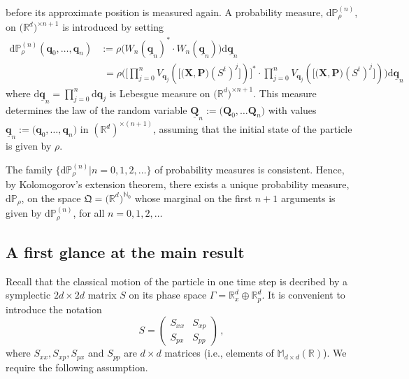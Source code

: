 \documentclass[11pt]{article}
\renewcommand{\d}{{\mathrm d}}
\begin{document}
before its approximate position is measured again.
A probability measure, $\d\mathbb{P}_{\rho}^{(n)}$, on $\big(\mathbb{R}^{d}\big)^{\times{n+1}}$ is introduced by setting
\begin{align}\label{prob}
\d \mathbb{P}^{(n)}_{\rho}(\mathbf{q}_0,\dots, \mathbf{q}_n)&:= \rho\big( W_{n}(\underline{\mathbf{q}}_n)^{*}\cdot 
W_{n}(\underline{\mathbf{q}}_n)\big) \d\underline{\mathbf{q}}_{n}\nonumber\\
&\,\,= \rho\Big(\big[ \prod_{j=0}^{n} V_{\mathbf{q}_j}(\big[\big(\mathbf{X}, \mathbf{P}\big) (S^{t})^{j} \big])\big]^{*}\cdot  \prod_{j=0}^{n} V_{\mathbf{q}_j}(\big[\big(\mathbf{X}, \mathbf{P}\big) (S^{t})^{j} \big])  \Big)\d\underline{\mathbf{q}}_n
\end{align}
where $\d\underline{\mathbf{q}}_{n} =\prod_{j=0}^{n} \d\mathbf{q}_{j}$ is Lebesgue measure on $\big(\mathbb{R}^{d}\big)^{\times{n+1}}$.
This measure determines the law of the random variable $\underline{\mathbf{Q}}_{n}:=\big(\mathbf{Q}_0,\dots \mathbf{Q}_{n}\big)$ with values $\underline{\mathbf{q}}_{n}:= \big(\mathbf{q}_0, \dots, \mathbf{q}_n\big)$ in 
$(\mathbb{R}^{d})^{\times (n+1)}$, assuming that the initial state of the particle is given by $\rho$.

The family  $\big\{\d\mathbb{P}_{\rho}^{(n)}\vert n=0,1,2,\dots\big\}$ of probability measures is consistent. Hence, by Kolomogorov's extension theorem,  there exists a unique probability measure, $\d\mathbb{P}_{\rho}$, on the space $\mathfrak{Q}=\big(\mathbb{R}^{d}\big)^{\mathbb{N}_0}$ whose marginal on the first $n+1$ arguments is given by $\d\mathbb{P}_{\rho}^{(n)}$, for all $n=0,1,2,\dots$

\subsection{A first glance at the main result}\label{main-result}
Recall that the classical motion of the particle in one time step is decribed by a symplectic $2d\times 2d$ matrix $S$ on its phase space $\Gamma= \mathbb{R}^{d}_{x}\oplus \mathbb{R}^{d}_{p}$. It is convenient to introduce the notation 
\begin{equation}\label{ABCD}
S= \begin{pmatrix} S_{xx} & S_{xp}\\
                              S_{px} & S_{pp} \end{pmatrix}\,,
\end{equation}                              
where $S_{xx}, S_{xp}, S_{px}$ and $S_{pp}$ are $d\times d$ matrices (i.e., elements of 
$\mathbb{M}_{d\times d}(\mathbb{R})$).  
We require the following assumption.
\end{document}
